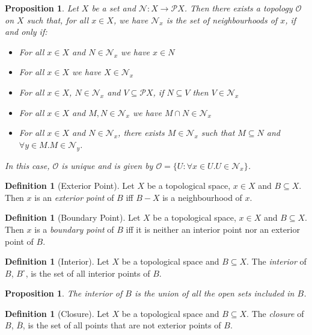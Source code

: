 \documentclass{book}
\newtheorem{prop}[ax]{Proposition}
\theoremstyle{definition}
\newtheorem{df}[ax]{Definition}
\begin{document}
\begin{prop}
Let $X$ be a set and $\mathcal{N} : X \rightarrow \mathcal{P} X$. Then there exists a topology $\mathcal{O}$ on $X$ such that, for all $x \in X$, we have $\mathcal{N}_x$ is the set of neighbourhoods of $x$, if and only if:
\begin{itemize}
\item For all $x \in X$ and $N \in \mathcal{N}_x$ we have $x \in N$
\item For all $x \in X$ we have $X \in \mathcal{N}_x$
\item For all $x \in X$, $N \in \mathcal{N}_x$ and $V \subseteq \mathcal{P} X$, if $N \subseteq V$ then $V \in \mathcal{N}_x$
\item For all $x \in X$ and $M, N \in \mathcal{N}_x$ we have $M \cap N \in \mathcal{N}_x$
\item For all $x \in X$ and $N \in \mathcal{N}_x$, there exists $M \in \mathcal{N}_x$ such that $M \subseteq N$ and $\forall y \in M. M \in \mathcal{N}_y$.
\end{itemize}
In this case, $\mathcal{O}$ is unique and is given by $\mathcal{O} = \{ U : \forall x \in U. U \in \mathcal{N}_x \}$.
\end{prop}

\begin{df}[Exterior Point]
Let $X$ be a topological space, $x \in X$ and $B \subseteq X$. Then $x$ is an \emph{exterior point} of $B$ iff $B - X$ is a neighbourhood of $x$.
\end{df}

\begin{df}[Boundary Point]
Let $X$ be a topological space, $x \in X$ and $B \subseteq X$. Then $x$ is a \emph{boundary point} of $B$ iff it is neither an interior point nor an exterior point of $B$.
\end{df}

\begin{df}[Interior]
Let $X$ be a topological space and $B \subseteq X$. The \emph{interior} of $B$, $B^\circ$, is the set of all interior points of $B$.
\end{df}

\begin{prop}
The interior of $B$ is the union of all the open sets included in $B$.
\end{prop}

\begin{df}[Closure]
Let $X$ be a topological space and $B \subseteq X$. The \emph{closure} of $B$, $\overline{B}$, is the set of all points that are not exterior points of $B$.
\end{df}
\end{document}
